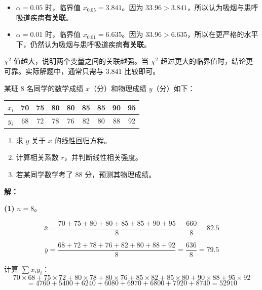 \documentclass[12pt, a4paper]{ctexart}
\begin{document}
\begin{itemize}[leftmargin=2em]
  \item $\alpha = 0.05$ 时，临界值 $x_{0.05} = 3.841$。因为 $33.96 > 3.841$，所以认为吸烟与患呼吸道疾病\textbf{有关联}。
  \item $\alpha = 0.01$ 时，临界值 $x_{0.01} = 6.635$。因为 $33.96 > 6.635$，所以在更严格的水平下，仍然认为吸烟与患呼吸道疾病\textbf{有关联}。
\end{itemize}

\begin{tipbox}[方法总结]
$\chi^2$ 值越大，说明两个变量之间的关联越强。当 $\chi^2$ 超过更大的临界值时，结论更可靠。实际解题中，通常只需与 $3.841$ 比较即可。
\end{tipbox}

\bigskip

\begin{examplebox}[【例8】回归方程与独立性检验的综合]
某班 $8$ 名同学的数学成绩 $x$（分）和物理成绩 $y$（分）如下：

\begin{center}
\begin{tabular}{c|cccccccc}
\toprule
$x_i$ & 70 & 75 & 80 & 80 & 85 & 85 & 90 & 95 \\
\midrule
$y_i$ & 68 & 72 & 78 & 76 & 82 & 80 & 88 & 92 \\
\bottomrule
\end{tabular}
\end{center}

\begin{enumerate}[label=(\arabic*)]
  \item 求 $y$ 关于 $x$ 的线性回归方程。
  \item 计算相关系数 $r$，并判断线性相关强度。
  \item 若某同学数学考了 $88$ 分，预测其物理成绩。
\end{enumerate}
\end{examplebox}

\textbf{解：}

\textbf{(1)} $n = 8$。

\[
\bar{x} = \frac{70+75+80+80+85+85+90+95}{8} = \frac{660}{8} = 82.5
\]

\[
\bar{y} = \frac{68+72+78+76+82+80+88+92}{8} = \frac{636}{8} = 79.5
\]

计算 $\sum x_iy_i$：
\[
70\times68 + 75\times72 + 80\times78 + 80\times76 + 85\times82 + 85\times80 + 90\times88 + 95\times92
\]
\[
= 4760 + 5400 + 6240 + 6080 + 6970 + 6800 + 7920 + 8740 = 52910
\]
\end{document}
